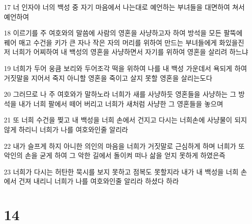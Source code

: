 \par 17 너 인자야 너의 백성 중 자기 마음에서 나는대로 예언하는 부녀들을 대면하여 쳐서 예언하여
\par 18 이르기를 주 여호와의 말씀에 사람의 영혼을 사냥하고자 하여 방석을 모든 팔뚝에 꿰어 매고 수건을 키가 큰 자나 작은 자의 머리를 위하여 만드는 부녀들에게 화있을진저 너희가 어찌하여 내 백성의 영혼을 사냥하면서 자기를 위하여 영혼을 살리려 하느냐
\par 19 너희가 두어 웅큼 보리와 두어조각 떡을 위하여 나를 내 백성 가운데서 욕되게 하여 거짓말을 지어서 죽지 아니할 영혼을 죽이고 살지 못할 영혼을 살리는도다
\par 20 그러므로 나 주 여호와가 말하노라 너희가 새를 사냥하듯 영혼들을 사냥하는 그 방석을 내가 너희 팔에서 떼어 버리고 너희가 새처럼 사냥한 그 영혼들을 놓으며
\par 21 또 너희 수건을 찢고 내 백성을 너희 손에서 건지고 다시는 너희손에 사냥물이 되지 않게 하리니 너희가 나를 여호와인줄 알리라
\par 22 내가 슬프게 하지 아니한 의인의 마음을 너희가 거짓말로 근심하게 하며 너희가 또 악인의 손을 굳게 하여 그 악한 길에서 돌이켜 떠나 삶을 얻지 못하게 하였은즉
\par 23 너희가 다시는 허탄한 묵시를 보지 못하고 점복도 못할지라 내가 내 백성을 너희 손에서 건져 내리니 너희가 나를 여호와인줄 알리라 하셨다 하라

\chapter{14}

